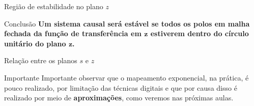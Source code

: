 \begin{frame}{Região de estabilidade no plano $z$}
\begin{minipage}{0.45\linewidth}
	\centering
	
	\scalebox{0.7}{}
\end{minipage}
\hfill
\begin{minipage}{0.45\linewidth}
	\centering
	
	\scalebox{0.7}{}
\end{minipage}

\begin{block}{Conclusão}
	\textbf{Um sistema causal será estável se todos os polos em malha fechada da função de transferência em $ \bm{z} $ estiverem dentro do círculo unitário do plano $ \bm{z} $.}
\end{block}

\end{frame}


\begin{frame}{Relação entre os planos $s$ e $z$}
\begin{block}{Importante}
Importante observar que o mapeamento exponencial, na prática, é pouco realizado, por limitação das técnicas digitais e que por causa disso é realizado por meio de \textbf{aproximações}, como veremos nas próximas aulas.
\end{block}
\end{frame}


